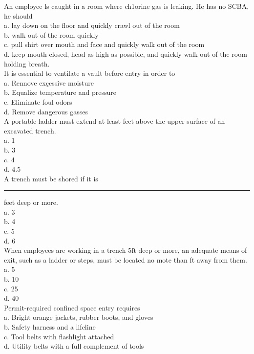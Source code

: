 An employee ls caught in a room where ch1orine gas is leaking.  He has no SCBA, he should\\
a.	lay down on the floor and quickly crawl out of the room \\
b.	walk out of the room quickly\\
c.	pull shirt over mouth and face and quickly walk out of the room\\
d.	keep mouth closed, head as high as possible, and quickly walk out of the room holding breath.\\

It is essential to ventilate a vault before entry in order to\\
a. Rennove exçessive moisture\\
b. Equalize temperature and pressure\\
c. Eliminate foul odors\\
d. Remove dangerous gasses\\

A portable ladder must extend at least feet above the upper surface of an excavated trench.\\
a. 1\\
b. 3\\
c. 4\\
d. 4.5\\

A trench must be shored if it is \rule{1.5cm}{0.5mm} feet deep or more.\\
a. 3\\
b. 4\\
c. 5\\
d. 6\\

When employees are working in a trench $5 \mathrm{ft}$ deep or more, an adequate means of exit, such as a ladder or steps, must be located no mote than ft away from them.\\
a. 5\\
b. 10\\
c. 25\\
d. 40\\


Permit-required confined space entry requires\\
a. Bright orange jackets, rubber boots, and gloves\\
b. Safety harness and a lifeline\\
c. Tool belts with flashlight attached\\
d. Utility belts with a full complement of tools\\


